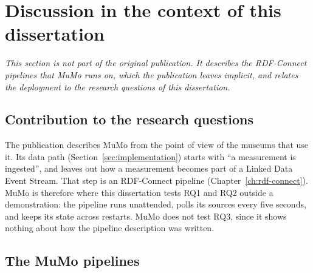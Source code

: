%

\section{Discussion in the context of this dissertation}\label{sec:mumo-dissertation}

\noindent\textit{%
    This section is not part of the original publication.
    It describes the RDF-Connect pipelines that MuMo runs on,
    which the publication leaves implicit,
    and relates the deployment to the research questions of this dissertation.
}

\subsection{Contribution to the research questions}

The publication describes MuMo from the point of view of the museums that use it.
Its data path (Section~\ref{sec:implementation}) starts with ``a measurement is ingested'',
and leaves out how a measurement becomes part of a Linked Data Event Stream.
That step is an RDF-Connect pipeline (Chapter~\ref{ch:rdf-connect}).
MuMo is therefore where this dissertation tests RQ1 and RQ2 outside a demonstration:
the pipeline runs unattended, polls its sources every five seconds,
and keeps its state across restarts.
MuMo does not test RQ3, since it shows nothing about how the pipeline description was written.

\subsection{The MuMo pipelines}

